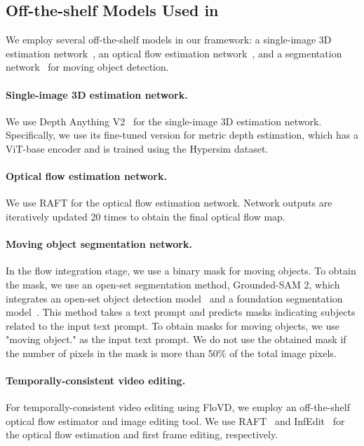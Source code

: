 \subsection{Off-the-shelf Models Used in \MethodName{}}
We employ several off-the-shelf models in our framework: a single-image 3D estimation network~\cite{yang2024depth}, an optical flow estimation network~\cite{teed2020raft}, and a segmentation network~\cite{ravi2024sam} for moving object detection.

\paragraph{Single-image 3D estimation network.}
We use Depth Anything V2~\cite{yang2024depth} for the single-image 3D estimation network. Specifically, we use its fine-tuned version for metric depth estimation, which has a ViT-base encoder and is trained using the Hypersim dataset.

\paragraph{Optical flow estimation network.}
We use RAFT \cite{teed2020raft} for the optical flow estimation network.
Network outputs are iteratively updated 20 times to obtain the final optical flow map.

\paragraph{Moving object segmentation network.}
In the flow integration stage, we use a binary mask for moving objects.
To obtain the mask, we use an open-set segmentation method, Grounded-SAM 2, which integrates an open-set object detection model~\cite{liu2023grounding} and a foundation segmentation model~\cite{ravi2024sam}.
This method takes a text prompt and predicts masks indicating subjects related to the input text prompt.
To obtain masks for moving objects, we use "moving object." as the input text prompt.
We do not use the obtained mask if the number of pixels in the mask is more than 50\% of the total image pixels.

\paragraph{Temporally-consistent video editing.}
For temporally-consistent video editing using FloVD, we employ an off-the-shelf optical flow estimator and image editing tool.
We use RAFT~\cite{teed2020raft} and InfEdit~\cite{xu2023inversion} for the optical flow estimation and first frame editing, respectively.

